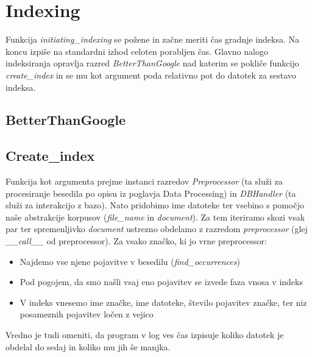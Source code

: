 \documentclass[runningheads]{llncs}
\begin{document}
\section{Indexing}
Funkcija \textit{initiating\_indexing} se požene in začne meriti čas gradnje indeksa. Na koncu izpiše na standardni izhod celoten porabljen čas. Glavno nalogo indeksiranja opravlja razred \textit{BetterThanGoogle} nad katerim se pokliče funkcijo \textit{create\_index} in se mu kot argument poda relativno pot do datotek za sestavo indeksa.

\subsection{BetterThanGoogle}

\subsection{Create\_index}
Funkcija kot argumenta prejme instanci razredov \textit{Preprocessor} (ta služi za procesiranje besedila po opisu iz poglavja Data Processing) in \textit{DBHandler} (ta služi za interakcijo z bazo). Nato pridobimo ime datoteke ter vsebino s pomočjo naše abstrakcije korpusov (\textit{file\_name} in \textit{document}). Za tem iteriramo skozi vsak par ter spremenljivko \textit{document} ustrezno obdelamo z razredom \textit{preprocessor} (glej \textit{\_\_call\_\_} od preprocessor). Za vsako značko, ki jo vrne preprocessor:
\begin{itemize}
\item Najdemo vse njene pojavitve v besedilu (\textit{find\_occurrences})
\item Pod pogojem, da smo našli vsaj eno pojavitev se izvede faza vnosa v indeks
\item V indeks vnesemo ime značke, ime datoteke, število pojavitev značke, ter niz posameznih pojavitev ločen z vejico
\end{itemize}
Vredno je tudi omeniti, da program v log ves čas izpisuje koliko datotek je obdelal do sedaj in koliko mu jih še manjka.
\end{document}
